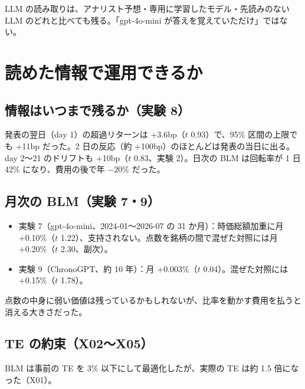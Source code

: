 \documentclass[xelatex,ja=standard,jafont=haranoaji,a4paper,10pt]{bxjsreport}
\begin{document}
\begin{keybox}
LLM の読み取りは、アナリスト予想・専用に学習したモデル・先読みのない LLM のどれと比べても残る。「gpt-4o-mini が答えを覚えていただけ」ではない。
\end{keybox}

\chapter{読めた情報で運用できるか}\label{ch:large-blm}

\section{情報はいつまで残るか（実験 8）}

発表の翌日（day 1）の超過リターンは +3.6bp（$t$ 0.93）で、95\% 区間の上限でも +11bp だった。2 日の反応（約 +100bp）のほとんどは発表の当日に出る。day 2〜21 のドリフトも +10bp（$t$ 0.83、実験 2）。日次の BLM は回転率が 1 日 42\% になり、費用の後で年 $-20\%$ だった。

\section{月次の BLM（実験 7・9）}

\begin{itemize}
\item 実験 7（gpt-4o-mini、2024-01〜2026-07 の 31 か月）：時価総額加重に月 +0.10\%（$t$ 1.22）、支持されない。点数を銘柄の間で混ぜた対照には月 +0.20\%（$t$ 2.30、副次）。
\item 実験 9（ChronoGPT、約 10 年）：月 +0.003\%（$t$ 0.04）。混ぜた対照には +0.15\%（$t$ 1.78）。
\end{itemize}

点数の中身に弱い価値は残っているかもしれないが、比率を動かす費用を払うと消える大きさだった。

\section{TE の約束（X02〜X05）}

BLM は事前の TE を 3\% 以下にして最適化したが、実際の TE は約 1.5 倍になった（X01）。
\end{document}

